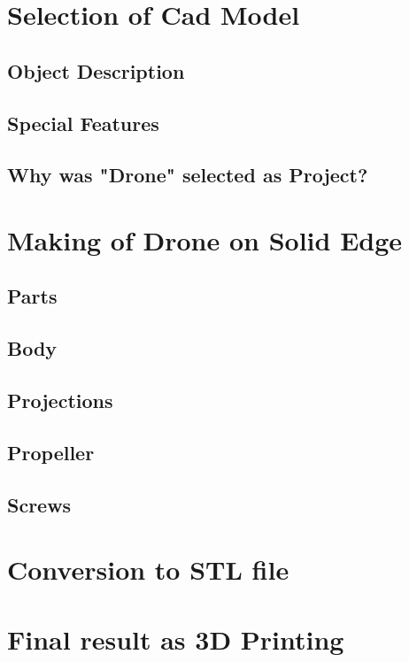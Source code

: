 \documentclass{article}
\begin{document}

\section{Selection of Cad Model}
\subsection{Object Description}
\subsection{Special Features}
\subsection{Why was "Drone" selected as Project? }

\section{Making of Drone on Solid Edge}
\subsection{Parts}
\subsection{Body}
\subsection{Projections}
\subsection{Propeller}
\subsection{Screws}

\section{Conversion to STL file}

\section{Final result as 3D Printing}
\end{document}
